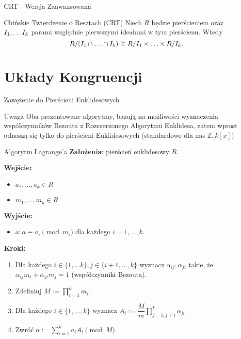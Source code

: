 \documentclass{beamer}
\newcommand{\II}{\mathnormal{I}}
\begin{document}
\begin{frame}{CRT - Wersja Zaawansowana}
    \begin{block}{Chińskie Twierdzenie o Resztach (CRT)}
        Niech $R$ będzie pierścieniem oraz $\II_1, \ldots \II_k$ parami względnie pierwszymi ideałami w tym pierścienu.
        Wtedy 
        $$ R/(\II_1 \cap \ldots \cap \II_k) \cong R/\II_1 \times \ldots \times R/ \II_k. $$
    \end{block}
\end{frame}

\section{Układy Kongruencji}
\begin{frame}{Zawężenie do Pierścieni Euklidesowych}
    \begin{alertblock}{Uwaga}
        Oba prezentowane algorytmy, bazują na możliwości wyznaczenia współczynników Bezouta z Rozszerzonego
        Algorytmu Euklidesa, zatem wprost odnoszą się tylko do pierścieni Euklidesowych (standardowo dla nas $\mathbb{Z}, k[x]$)
    \end{alertblock}
\end{frame}

\begin{frame}{Algorytm Lagrange'a}
    \textbf{Założenia}: pierścień euklidesowy $R$.

    \textbf{Wejście:}
    \begin{itemize}
        \item $a_1, \ldots , a_k \in R$
        \item $m_1, \ldots , m_k \in R$
    \end{itemize}
    \textbf{Wyjście:}
    \begin{itemize}
        \item $a : a \equiv a_i \pmod{m_i}$ dla każdego $i=1,\ldots,k$.
    \end{itemize}
    \textbf{Kroki:}
    \begin{enumerate}
        \item Dla każdego $i \in \{1, \ldots k\}, j \in \{i+1,\ldots,k\} $ wyznacz $\alpha_{ij},\alpha_{ji}$ takie, że 
        $\alpha_{ij}m_i + \alpha_{ji}m_j = 1$ (współczynniki Bezouta).
        \item Zdefiniuj $M := \prod_{i=1}^{k}m_i.$ 
        \item Dla każdego $i \in \{1,\ldots,k\}$ wyznacz $A_i := \dfrac{M}{m}\prod_{j=1, j\neq i}^{k}\alpha_{ji}.$
        \item Zwróć $a := \sum_{i=1}^{k}a_i A_i \pmod{M}.$ 
    \end{enumerate}
\end{frame}
\end{document}
